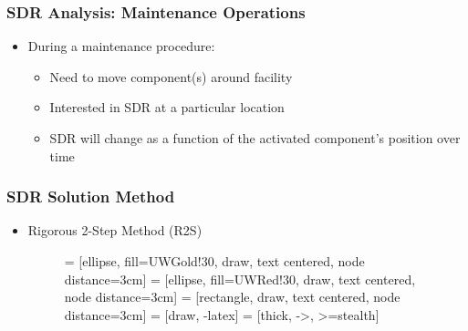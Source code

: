 \documentclass{beamer}
\begin{document}
\begin{frame}
\frametitle{SDR Analysis: Maintenance Operations}
	\begin{itemize}
		\item{During a maintenance procedure:}
			\begin{itemize}
				\item{Need to move component(s) around facility}
				\item{Interested in SDR at a particular
					location}
				\item{SDR will change as a function of the
					activated component's position over
					time}
			\end{itemize}
	\end{itemize}
\end{frame}

\begin{frame}
\frametitle{SDR Solution Method}
\begin{itemize}
\item{Rigorous 2-Step Method (R2S)}
\begin{figure}
\centering

         = [ellipse, fill=UWGold!30, draw, text centered, node distance=3cm]
         = [ellipse, fill=UWRed!30, draw, text centered, node distance=3cm]
         = [rectangle, draw, text centered, node distance=3cm]
         = [draw, -latex]
         = [thick, ->, >=stealth]
        

\end{figure}

\end{itemize}
\end{frame}
\end{document}
